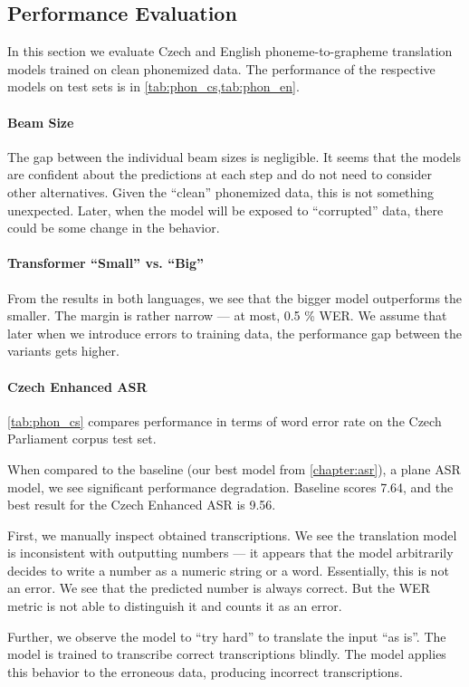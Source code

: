 \subsection{Performance Evaluation}
In this section we evaluate Czech and English phoneme-to-grapheme translation models trained on clean phonemized data. The performance of the respective models on test sets is in \cref{tab:phon_cs,tab:phon_en}.

\paragraph{Beam Size} The gap between the individual beam sizes is negligible. It seems that the models are confident about the predictions at each step and do not need to consider other alternatives. Given the ``clean'' phonemized data, this is not something unexpected. Later, when the model will be exposed to ``corrupted'' data, there could be some change in the behavior.

\paragraph{Transformer ``Small'' vs. ``Big''} From the results in both languages, we see that the bigger model outperforms the smaller. The margin is rather narrow --- at most, 0.5 \% WER. We assume that later when we introduce errors to training data, the performance gap between the variants gets higher.

\paragraph{Czech Enhanced ASR}
\cref{tab:phon_cs} compares performance in terms of word error rate on the Czech Parliament corpus test set. 

When compared to the baseline (our best model from \cref{chapter:asr}), a plane ASR model, we see significant performance degradation. Baseline scores 7.64, and the best result for the Czech Enhanced ASR is 9.56. 

First, we manually inspect obtained transcriptions. We see the translation model is inconsistent with outputting numbers --- it appears that the model arbitrarily decides to write a number as a numeric string or a word. Essentially, this is not an error. We see that the predicted number is always correct. But the WER metric is not able to distinguish it and counts it as an error.

Further, we observe the model to ``try hard'' to translate the input ``as is''. The model is trained to transcribe correct transcriptions blindly. The model applies this behavior to the erroneous data, producing incorrect transcriptions.    


